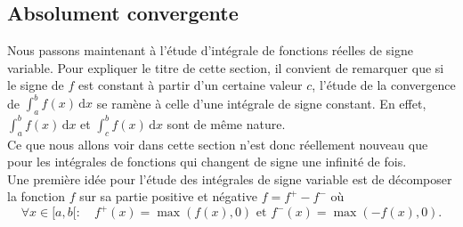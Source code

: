 \documentclass{book}
\begin{document}
\subsection{Absolument convergente}
Nous passons maintenant à l'étude d'intégrale de fonctions réelles de signe variable. Pour expliquer le titre de cette section,
 il convient de remarquer que si le signe de $f$ est constant
à partir d'un certaine valeur $c$, l'étude de la convergence de $\int_a^b f(x)\,\mathrm dx$ se ramène à celle d'une
intégrale de signe constant. En effet,  $\int_a^b f(x)\,\mathrm dx$ et $\int_c^b f(x)\,\mathrm dx$ sont de même nature.\\
Ce que nous allons voir dans cette section n'est donc réellement nouveau que pour les intégrales de fonctions qui changent de signe
une infinité de fois.\\
Une première idée pour l'étude des intégrales de signe variable est de décomposer la fonction $f$ sur sa partie positive et négative $f = f^+-f^-$ où $$\forall x\in [a,b[:\quad f^+(x)=\max(f(x),0)\text{ et } f^-(x)=\max(-f(x),0).$$
\begin{center}
\end{center}
\end{document}
